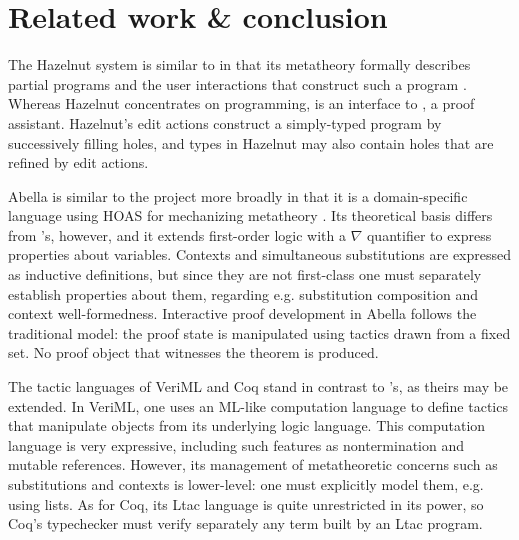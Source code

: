 \chapter{Related work \& conclusion}

The Hazelnut system is similar to \Harpoon{} in that its metatheory formally
describes partial programs and the user interactions that construct such a
program \cite{hazelnut}.
Whereas Hazelnut concentrates on programming, \Harpoon{} is an interface to
\Beluga, a proof assistant. Hazelnut's edit actions construct a simply-typed
program by successively filling holes, and types in Hazelnut may also contain
holes that are refined by edit actions.

Abella is similar to the \Beluga{} project more broadly in that it is a
domain-specific language using HOAS for mechanizing metatheory
\cite{Gacek:IJCAR08, Gacek:JAR12}.
Its theoretical basis differs from \Beluga's, however, and it extends
first-order logic with a $\nabla$ quantifier to express properties about
variables. Contexts and simultaneous substitutions are expressed as inductive
definitions, but since they are not first-class one must separately establish
properties about them, regarding e.g. substitution composition and context
well-formedness. Interactive proof development in Abella follows the traditional
model: the proof state is manipulated using tactics drawn from a fixed set. No
proof object that witnesses the theorem is produced.

The tactic languages of VeriML \cite{Stampoulis:ICFP10,Stampoulis:POPL12} and
Coq stand in contrast to \Harpoon's, as theirs may be extended.
In VeriML, one uses an ML-like computation language to define tactics that
manipulate objects from its underlying logic language.
This computation language is very expressive, including such features as
nontermination and mutable references.
However, its management of metatheoretic concerns such as substitutions and
contexts is lower-level: one must explicitly model them, e.g. using lists.
As for Coq, its Ltac language \cite{Delahaye:LPAR00} is quite
unrestricted in its power, so Coq's typechecker must verify separately any term
built by an Ltac program.

